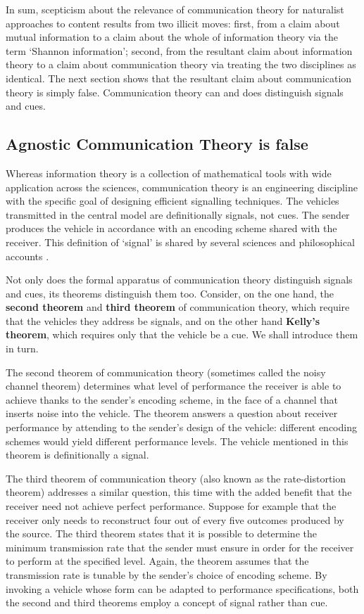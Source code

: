 In sum, scepticism about the relevance of communication theory for naturalist approaches to content results from two illicit moves: first, from a claim about mutual information to a claim about the whole of information theory via the term `Shannon information'; second, from the resultant claim about information theory to a claim about communication theory via treating the two disciplines as identical.
The next section shows that the resultant claim about communication theory is simply false.
Communication theory can and does distinguish signals and cues.


\subsection{{\sc Agnostic Communication Theory} is false}

Whereas information theory is a collection of mathematical tools with wide application across the sciences, communication theory is an engineering discipline with the specific goal of designing efficient signalling techniques.
The vehicles transmitted in the central model are definitionally signals, not cues.
The sender produces the vehicle in accordance with an encoding scheme shared with the receiver.
This definition of `signal' is shared by several sciences \citep{shannon1948mathematicala,maynardsmith2003animal} and philosophical accounts \citep[$\S$6]{millikan2004varieties} \citep{bergstrom2011transmission}.

Not only does the formal apparatus of communication theory distinguish signals and cues, its theorems distinguish them too.
Consider, on the one hand, the \textbf{second theorem} and \textbf{third theorem} of communication theory, which require that the vehicles they address be signals, and on the other hand \textbf{Kelly's theorem}, which requires only that the vehicle be a cue.
We shall introduce them in turn.

The second theorem of communication theory (sometimes called the noisy channel theorem) determines what level of performance the receiver is able to achieve thanks to the sender's encoding scheme, in the face of a channel that inserts noise into the vehicle.
The theorem answers a question about receiver performance by attending to the sender's design of the vehicle: different encoding schemes would yield different performance levels.
The vehicle mentioned in this theorem is definitionally a signal.

The third theorem of communication theory (also known as the rate-distortion theorem) addresses a similar question, this time with the added benefit that the receiver need not achieve perfect performance.
Suppose for example that the receiver only needs to reconstruct four out of every five outcomes produced by the source.
The third theorem states that it is possible to determine the minimum transmission rate that the sender must ensure in order for the receiver to perform at the specified level.
Again, the theorem assumes that the transmission rate is tunable by the sender's choice of encoding scheme.
By invoking a vehicle whose form can be adapted to performance specifications, both the second and third theorems employ a concept of signal rather than cue.

